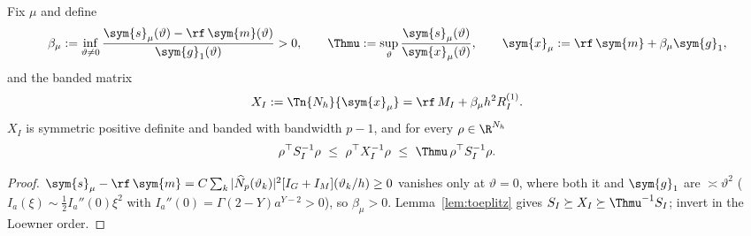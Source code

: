 \begin{theorem}\label{thm:comparison}
Fix $\mu$ and define
\[
 \beta_\mu:=\inf_{\vartheta\ne0}\frac{\sym{s}_\mu(\vartheta)-\rf\,\sym{m}(\vartheta)}{\sym{g}_1(\vartheta)}>0,
 \qquad
 \Thmu:=\sup_\vartheta\frac{\sym{s}_\mu(\vartheta)}{\sym{x}_\mu(\vartheta)},
 \qquad
 \sym{x}_\mu:=\rf\,\sym{m}+\beta_\mu \sym{g}_1,
\]
and the banded matrix
\[
 X_I:=\Tn{N_h}{\sym{x}_\mu}=\rf\,M_I+\beta_\mu h^2R^{(1)}_I.
\]
$X_I$ is symmetric positive definite and banded with bandwidth $p-1$, and
for every $\rho\in\R^{N_h}$
\begin{equation}
 \rho^\top S_I^{-1}\rho\ \le\ \rho^\top X_I^{-1}\rho\ \le\ \Thmu\,\rho^\top S_I^{-1}\rho .
 \label{eq:comparison}
\end{equation}
\end{theorem}
\begin{proof}
$\sym{s}_\mu-\rf\,\sym{m}=C\sum_k|\widehat N_p(\vartheta_k)|^2[I_G+I_M](\vartheta_k/h)\ge0$ vanishes
only at $\vartheta=0$, where both it and $\sym{g}_1$ are $\asymp\vartheta^2$
($I_a(\xi)\sim\tfrac12 I_a''(0)\xi^2$ with $I_a''(0)=\Gamma(2-Y)a^{Y-2}>0$), so
$\beta_\mu>0$.  Lemma~\ref{lem:toeplitz} gives $S_I\succeq X_I\succeq\Thmu^{-1}S_I$;
invert in the Loewner order.
\end{proof}
